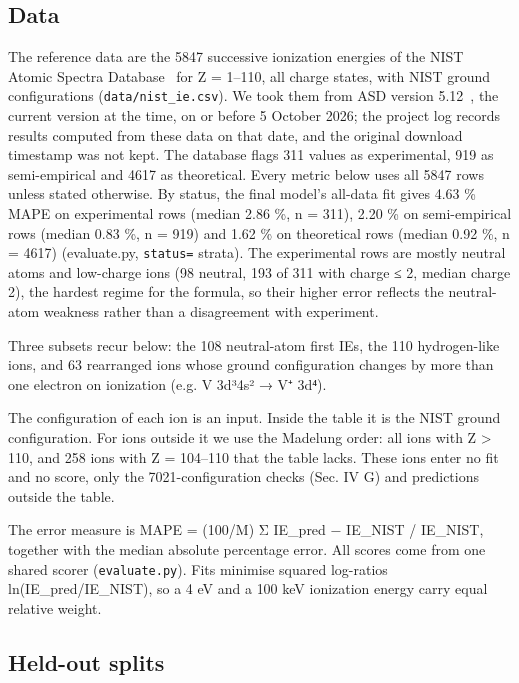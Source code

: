 \documentclass[aps,pra,preprint,superscriptaddress,amsmath,amssymb]{revtex4-2}
\begin{document}
\subsection{Data}

The reference data are the 5847 successive ionization energies of the NIST Atomic Spectra Database~\cite{r32} for Z = 1–110, all charge states, with NIST ground configurations (\texttt{data/nist\_ie.csv}). We took them from ASD version 5.12~\cite{r32}, the current version at the time, on or before 5 October 2026; the project log records results computed from these data on that date, and the original download timestamp was not kept. The database flags 311 values as experimental, 919 as semi-empirical and 4617 as theoretical. Every metric below uses all 5847 rows unless stated otherwise. By status, the final model's all-data fit gives 4.63 \% MAPE on experimental rows (median 2.86 \%, n = 311), 2.20 \% on semi-empirical rows (median 0.83 \%, n = 919) and 1.62 \% on theoretical rows (median 0.92 \%, n = 4617) (evaluate.py, \texttt{status=} strata). The experimental rows are mostly neutral atoms and low-charge ions (98 neutral, 193 of 311 with charge ≤ 2, median charge 2), the hardest regime for the formula, so their higher error reflects the neutral-atom weakness rather than a disagreement with experiment.


Three subsets recur below: the 108 neutral-atom first IEs, the 110 hydrogen-like ions, and 63 rearranged ions whose ground configuration changes by more than one electron on ionization (e.g. V 3d³4s² → V⁺ 3d⁴).


The configuration of each ion is an input. Inside the table it is the NIST ground configuration. For ions outside it we use the Madelung order: all ions with Z > 110, and 258 ions with Z = 104–110 that the table lacks. These ions enter no fit and no score, only the 7021-configuration checks (Sec. IV G) and predictions outside the table.


The error measure is MAPE = (100/M) Σ \textbar{}IE\_pred − IE\_NIST\textbar{} / IE\_NIST, together with the median absolute percentage error. All scores come from one shared scorer (\texttt{evaluate.py}). Fits minimise squared log-ratios ln(IE\_pred/IE\_NIST), so a 4 eV and a 100 keV ionization energy carry equal relative weight.


\subsection{Held-out splits}
\end{document}
